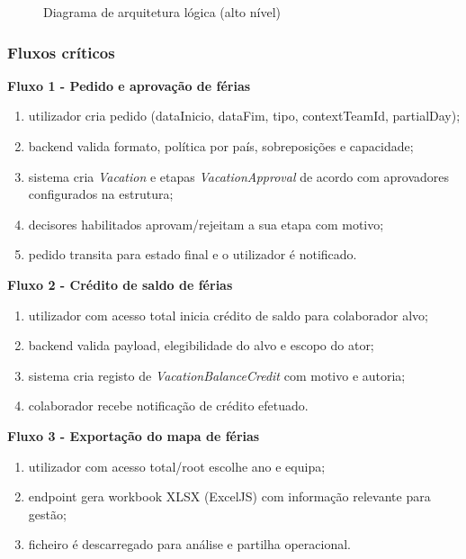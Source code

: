 \documentclass[11pt,a4paper]{article}
\begin{document}
\begin{figure}[h]
  \centering
  \caption{Diagrama de arquitetura lógica (alto nível)}
  \label{fig:arquitetura-logica}
\end{figure}

\subsubsection{Fluxos críticos}
\textbf{Fluxo 1 - Pedido e aprovação de férias}
\begin{enumerate}
  \item utilizador cria pedido (dataInicio, dataFim, tipo, contextTeamId, partialDay);
  \item backend valida formato, política por país, sobreposições e capacidade;
  \item sistema cria \textit{Vacation} e etapas \textit{VacationApproval} de acordo com aprovadores configurados na estrutura;
  \item decisores habilitados aprovam/rejeitam a sua etapa com motivo;
  \item pedido transita para estado final e o utilizador é notificado.
\end{enumerate}

\textbf{Fluxo 2 - Crédito de saldo de férias}
\begin{enumerate}
  \item utilizador com acesso total inicia crédito de saldo para colaborador alvo;
  \item backend valida payload, elegibilidade do alvo e escopo do ator;
  \item sistema cria registo de \textit{VacationBalanceCredit} com motivo e autoria;
  \item colaborador recebe notificação de crédito efetuado.
\end{enumerate}

\textbf{Fluxo 3 - Exportação do mapa de férias}
\begin{enumerate}
  \item utilizador com acesso total/root escolhe ano e equipa;
  \item endpoint gera workbook XLSX (ExcelJS) com informação relevante para gestão;
  \item ficheiro é descarregado para análise e partilha operacional.
\end{enumerate}
\end{document}
